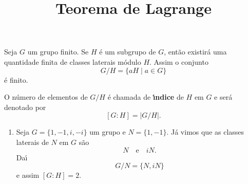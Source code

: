 \documentclass{beamer}
\title{Teorema de Lagrange}
\author[\autor]{\autor}
\institute[\instituto]{\instituto}
\date{}
\begin{document}
    \begin{frame}
        \maketitle
    \end{frame}


    \begin{frame}
        Seja $G$ um grupo finito. Se $H$ \'e um subgrupo de $G$, ent\~ao existir\'a uma quantidade finita de classes laterais m\'odulo $H$.
        Assim o conjunto
        \[
            G/H = \{aH \mid a \in G\}
        \]
        \'e finito.

        O n\'umero de elementos de $G/H$ \'e chamada de \textbf{{\'\i}ndice} de $H$ em $G$ e ser\'a denotado por
        \[
            [G : H] = |G/H|.
        \]
    \end{frame}

    \begin{frame}
        \begin{exemplos}
            \begin{enumerate}[label=({\arabic*})]
                \item Seja $G = \{1, -1, i, -i\}$ um grupo \pause e $N = \{1, -1\}$. J\'a vimos que as classes laterais de $N$ em $G$ s\~ao
                \[
                    N \quad \mbox{e}\quad iN.
                \]
                Da{\'\i}
                \[
                    G/N = \{N, iN\}
                \]
                e assim $[G : H] = 2$.

                \seti
            \end{enumerate}
        \end{exemplos}
    \end{frame}
\end{document}
